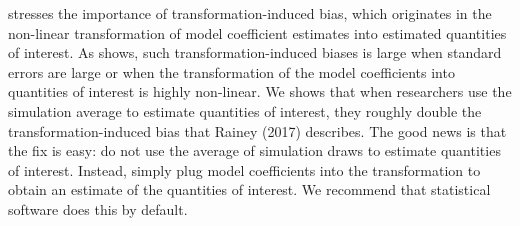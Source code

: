 \documentclass[11pt]{article}
\begin{document}
\cite{Rainey2017} stresses the importance of transformation-induced bias, which originates in the non-linear transformation of model coefficient estimates into estimated quantities of interest.
As \cite{Rainey2017} shows, such transformation-induced biases is large when standard errors are large or when the transformation of the model coefficients into quantities of interest is highly non-linear.
We shows that when researchers use the simulation average to estimate quantities of interest, they roughly double the transformation-induced bias that Rainey (2017) describes.
The good news is that the fix is easy: do not use the average of simulation draws to estimate quantities of interest.
Instead, simply plug model coefficients into the transformation to obtain an estimate of the quantities of interest.
We recommend that statistical software does this by default.%


\singlespace
\small


\end{document}
